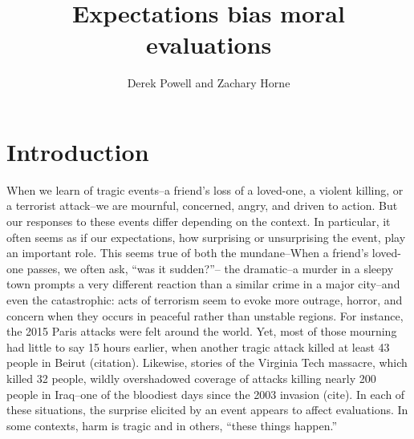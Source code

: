 \documentclass[12pt,]{article}
\title{Expectations bias moral evaluations}
\author{Derek Powell and Zachary Horne}
\date{}
\begin{document}
\maketitle

\section{Introduction}\label{introduction}

When we learn of tragic events--a friend's loss of a loved-one, a
violent killing, or a terrorist attack--we are mournful, concerned,
angry, and driven to action. But our responses to these events differ
depending on the context. In particular, it often seems as if our
expectations, how surprising or unsurprising the event, play an
important role. This seems true of both the mundane--When a friend's
loved-one passes, we often ask, ``was it sudden?''-- the dramatic--a
murder in a sleepy town prompts a very different reaction than a similar
crime in a major city--and even the catastrophic: acts of terrorism seem
to evoke more outrage, horror, and concern when they occurs in peaceful
rather than unstable regions. For instance, the 2015 Paris attacks were
felt around the world. Yet, most of those mourning had little to say 15
hours earlier, when another tragic attack killed at least 43 people in
Beirut (citation). Likewise, stories of the Virginia Tech massacre,
which killed 32 people, wildly overshadowed coverage of attacks killing
nearly 200 people in Iraq--one of the bloodiest days since the 2003
invasion (cite). In each of these situations, the surprise elicited by
an event appears to affect evaluations. In some contexts, harm is tragic
and in others, ``these things happen.''
\end{document}
